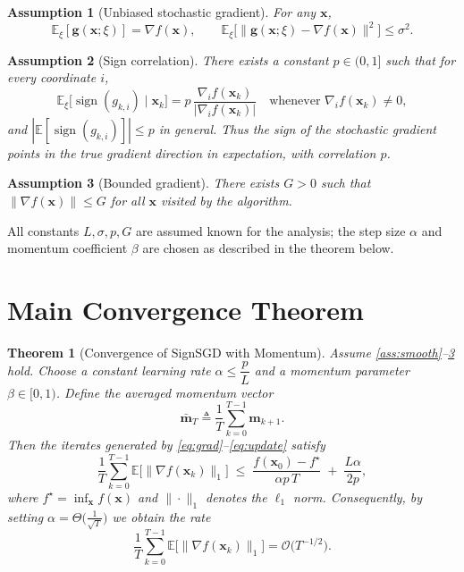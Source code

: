 \documentclass{article}
\newtheorem{theorem}{Theorem}
\newtheorem{assumption}{Assumption}
\newcommand{\sgn}{\operatorname{sign}}
\begin{document}
\begin{assumption}[Unbiased stochastic gradient]\label{ass:unbiased}
For any $\mathbf{x}$,
\[
\mathbb{E}_{\xi}[\mathbf{g}(\mathbf{x};\xi)]=\nabla f(\mathbf{x}),\qquad 
\mathbb{E}_{\xi}\big[\|\mathbf{g}(\mathbf{x};\xi)-\nabla f(\mathbf{x})\|^{2}\big]\le\sigma^{2}.
\]
\end{assumption}

\begin{assumption}[Sign correlation]\label{ass:sign}
There exists a constant $p\in(0,1]$ such that for every coordinate $i$,
\[
\mathbb{E}_{\xi}\big[ \sgn(g_{k,i})\;\big|\;\mathbf{x}_{k}\big]
= p\,\frac{\nabla_{i}f(\mathbf{x}_{k})}{|\nabla_{i}f(\mathbf{x}_{k})|}\quad\text{whenever }\nabla_{i}f(\mathbf{x}_{k})\neq0,
\]
and $|\mathbb{E}[\sgn(g_{k,i})]|\le p$ in general.  
Thus the sign of the stochastic gradient points in the true gradient direction in expectation, with correlation $p$.
\end{assumption}

\begin{assumption}[Bounded gradient]\label{ass:bound}
There exists $G>0$ such that $\|\nabla f(\mathbf{x})\|\le G$ for all $\mathbf{x}$ visited by the algorithm.
\end{assumption}

All constants $L,\sigma,p,G$ are assumed known for the analysis; the step size $\alpha$ and momentum coefficient $\beta$ are chosen as described in the theorem below.

\section*{Main Convergence Theorem}
\begin{theorem}[Convergence of SignSGD with Momentum]\label{thm:main}
Assume \ref{ass:smooth}–\ref{ass:bound} hold.  
Choose a constant learning rate $\alpha\le \dfrac{p}{L}$ and a momentum parameter $\beta\in[0,1)$.  
Define the averaged momentum vector
\[
\bar{\mathbf{m}}_{T}\triangleq\frac{1}{T}\sum_{k=0}^{T-1}\mathbf{m}_{k+1}.
\]
Then the iterates generated by \eqref{eq:grad}–\eqref{eq:update} satisfy
\[
\frac{1}{T}\sum_{k=0}^{T-1}\mathbb{E}\big[\|\nabla f(\mathbf{x}_{k})\|_{1}\big]
\;\le\;
\frac{f(\mathbf{x}_{0})-f^{\star}}{\alpha p\,T}
\;+\;
\frac{L\alpha}{2p},
\tag{5}
\]
where $f^{\star}= \inf_{\mathbf{x}}f(\mathbf{x})$ and $\|\cdot\|_{1}$ denotes the $\ell_{1}$ norm.
Consequently, by setting $\alpha=\Theta\!\big(\tfrac{1}{\sqrt{T}}\big)$ we obtain the rate
\[
\frac{1}{T}\sum_{k=0}^{T-1}\mathbb{E}\big[\|\nabla f(\mathbf{x}_{k})\|_{1}\big]=\mathcal{O}\!\big(T^{-1/2}\big).
\]
\end{theorem}
\end{document}
